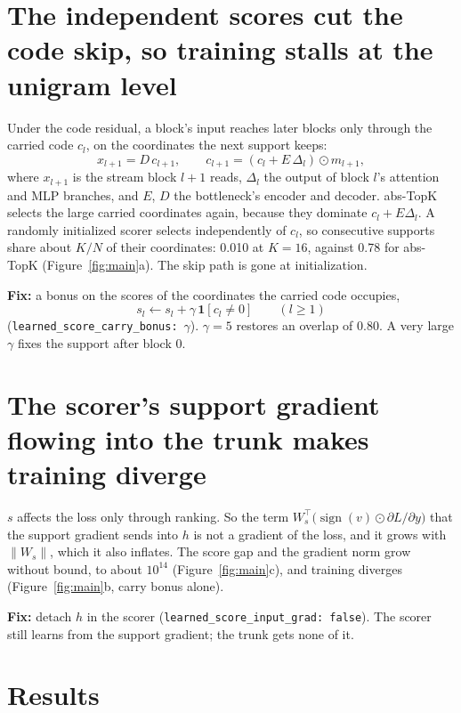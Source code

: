 \documentclass[11pt,a4paper]{article}
\newcommand{\code}[1]{\texttt{#1}}
\newcommand{\sign}{\operatorname{sign}}
\begin{document}
\section{The independent scores cut the code skip, so training stalls at the unigram level}

Under the code residual, a block's input reaches later blocks only through the carried code
$c_l$, on the coordinates the next support keeps:
\begin{equation}
  x_{l+1} = D\,c_{l+1}, \qquad c_{l+1} = (c_l + E\,\Delta_l)\odot m_{l+1},
\end{equation}
where $x_{l+1}$ is the stream block $l+1$ reads, $\Delta_l$ the output of block $l$'s
attention and MLP branches, and $E$, $D$ the bottleneck's encoder and decoder. abs-TopK
selects the large carried coordinates again, because they dominate $c_l + E\Delta_l$. A
randomly initialized scorer selects independently of $c_l$, so consecutive supports share
about $K/N$ of their coordinates: 0.010 at $K = 16$, against 0.78 for abs-TopK
(Figure~\ref{fig:main}a). The skip path is gone at initialization.

\textbf{Fix:} a bonus on the scores of the coordinates the carried code occupies,
\begin{equation}
  s_l \leftarrow s_l + \gamma\,\mathbf 1[c_l \neq 0] \qquad (l \ge 1)
\end{equation}
(\code{learned\_score\_carry\_bonus:}~$\gamma$). $\gamma = 5$ restores an overlap of 0.80. A
very large $\gamma$ fixes the support after block 0.

\section{The scorer's support gradient flowing into the trunk makes training diverge}

$s$ affects the loss only through ranking. So the term
$W_s^{\top}\big(\sign(v)\odot\partial L/\partial y\big)$ that the support gradient sends into
$h$ is not a gradient of the loss, and it grows with $\|W_s\|$, which it also inflates. The
score gap and the gradient norm grow without bound, to about $10^{14}$
(Figure~\ref{fig:main}c), and training diverges (Figure~\ref{fig:main}b, carry bonus alone).

\textbf{Fix:} detach $h$ in the scorer (\code{learned\_score\_input\_grad: false}). The
scorer still learns from the support gradient; the trunk gets none of it.

\section{Results}
\end{document}

